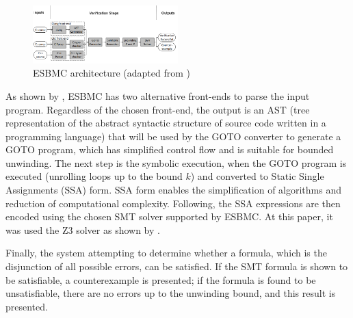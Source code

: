 \documentclass[journal]{IEEEtran}
\begin{document}
\begin{figure}[h]
\includegraphics[width=0.5\textwidth]{ESBMCarch2}
\centering
\caption{ESBMC architecture (adapted from \cite{GadelhaSBMF})}
\label{fig:esbmcarch}
\end{figure}

As shown by \cite{GadelhaSBMF}, ESBMC has two alternative front-ends to parse the input program. %
Regardless of the chosen front-end, the output is an AST (tree representation of the abstract syntactic structure of source code written in a programming language) that will be used by the GOTO converter to generate a GOTO program, which has simplified control flow and is suitable for bounded unwinding. The next step is the symbolic execution, when the GOTO program is executed (unrolling loops up to the bound $ k $) and converted to Static Single Assignments (SSA) form. SSA form enables the simplification of algorithms and reduction of computational complexity. %
%
Following, the SSA expressions are then encoded using the chosen SMT solver supported by ESBMC. At this paper, it was used the Z3 solver as shown by \cite{DeMoura}.

Finally, the system attempting to determine whether a formula, which is the disjunction of all possible errors, can be satisfied. If the SMT formula is shown to be satisfiable, a counterexample is presented; if the formula is found to be unsatisfiable, there are no errors up to the unwinding bound, and this result is presented. 
 
\end{document}
